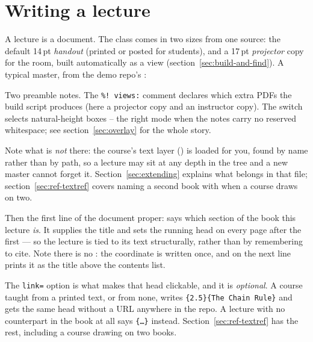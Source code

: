 \section{Writing a lecture}\label{sec:lectures}

A lecture is a  document. The class comes in two sizes from
one source: the default 14\,pt \emph{handout} (printed or posted for students),
and a 17\,pt \emph{projector} copy for the room, built automatically as a view
(section~\ref{sec:build-and-find}). A typical master, from the demo repo's
:


Two preamble notes. The \texttt{\%! views:} comment declares which extra PDFs
the build script produces (here a projector copy and an instructor copy). The
 switch selects natural-height boxes -- the right mode when the
notes carry no reserved whitespace; see section~\ref{sec:overlay} for the
whole story.

Note what is \emph{not} there: the course's text layer
() is loaded for you, found by name rather than
 by path, so a lecture may sit at any depth in the tree and a new
master cannot forget it. Section~\ref{sec:extending} explains what belongs in
that file; section~\ref{sec:ref-textref} covers naming a second book with
 when a course draws on two.

Then the first line of the document proper:  says which
section of the book this lecture \emph{is}. It supplies the title and sets the
running head on every page after the first --- so the lecture is tied to its text structurally,
rather than by remembering to cite. Note there is no : the
coordinate is written once, and  on the next line prints it as the
title above the contents list.

The \texttt{link=} option is what makes that head clickable, and it is
\emph{optional}. A course taught from a printed text, or from none, writes
\texttt{\{2.5\}\{The Chain Rule\}} and gets the same head
without a URL anywhere in the repo. A lecture with no counterpart in the book
at all says \texttt{\{\dots\}} instead.
Section~\ref{sec:ref-textref} has the rest, including a course drawing on two
books.

